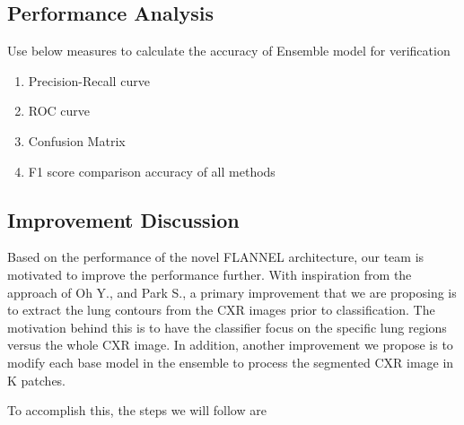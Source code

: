 \documentclass{sigkddExp}
\begin{document}
\subsection{Performance Analysis}
Use below measures to calculate the accuracy of Ensemble model for verification

\begin{enumerate}
    \item Precision-Recall curve
    \item ROC curve
    \item Confusion Matrix
    \item F1 score comparison accuracy of all methods 
\end{enumerate}



\subsection{Improvement Discussion}

Based on the performance of the novel FLANNEL architecture, our team is
motivated to improve the performance further. With inspiration from the approach
of Oh Y., and Park S., a primary improvement that we are proposing is to extract
the lung contours from the CXR images prior to classification. The motivation
behind this is to have the classifier focus on the specific lung regions versus
the whole CXR image. In addition, another improvement we propose is to modify
each base model in the ensemble to process the segmented CXR image in K patches.

To accomplish this, the steps we will follow are
\end{document}
